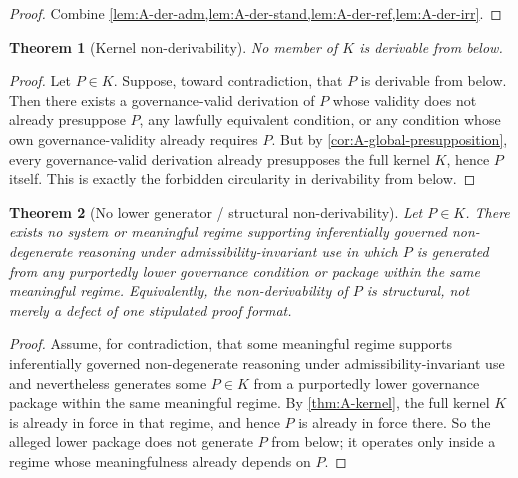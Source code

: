 \documentclass[11pt]{article}
\theoremstyle{plain}
\newtheorem{theorem}{Theorem}[section]
\theoremstyle{definition}
\begin{document}
\begin{proof}
Combine \cref{lem:A-der-adm,lem:A-der-stand,lem:A-der-ref,lem:A-der-irr}.
\end{proof}

\begin{theorem}[Kernel non-derivability]
\label{thm:A-kernel-nonderivable}
No member of $K$ is derivable from below.
\end{theorem}

\begin{proof}
Let $P\in K$. Suppose, toward contradiction, that $P$ is derivable from below. Then there exists a governance-valid derivation of $P$ whose validity does not already presuppose $P$, any lawfully equivalent condition, or any condition whose own governance-validity already requires $P$. But by \cref{cor:A-global-presupposition}, every governance-valid derivation already presupposes the full kernel $K$, hence $P$ itself. This is exactly the forbidden circularity in derivability from below.
\end{proof}

\begin{theorem}[No lower generator / structural non-derivability]
\label{thm:A-structural-nonderivability}
Let $P\in K$. There exists no system or meaningful regime supporting inferentially governed non-degenerate reasoning under admissibility-invariant use in which $P$ is generated from any purportedly lower governance condition or package within the same meaningful regime. Equivalently, the non-derivability of $P$ is structural, not merely a defect of one stipulated proof format.
\end{theorem}

\begin{proof}
Assume, for contradiction, that some meaningful regime supports inferentially governed non-degenerate reasoning under admissibility-invariant use and nevertheless generates some $P\in K$ from a purportedly lower governance package within the same meaningful regime. By \cref{thm:A-kernel}, the full kernel $K$ is already in force in that regime, and hence $P$ is already in force there. So the alleged lower package does not generate $P$ from below; it operates only inside a regime whose meaningfulness already depends on $P$.
\end{proof}
\end{document}
